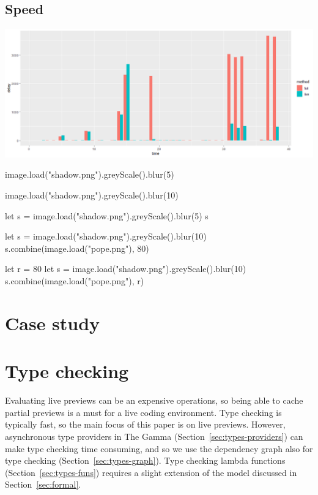 \documentclass[acmsmall,anonymous,fleqn]{acmart}\settopmatter{printfolios=false,printccs=false,printacmref=false}
\theoremstyle{plain}
\theoremstyle{definition}
\begin{document}


\subsection{Speed}
\label{sec:evaluation-empirical}

\includegraphics[scale=0.4]{drawing.png}

image.load("shadow.png").greyScale().blur(5)

image.load("shadow.png").greyScale().blur(10)

let s = image.load("shadow.png").greyScale().blur(5)
s

let s = image.load("shadow.png").greyScale().blur(10)
s.combine(image.load("pope.png"), 80)

let r = 80
let s = image.load("shadow.png").greyScale().blur(10)
s.combine(image.load("pope.png"), r)

\newpage

\section{Case study}
\label{sec:case}


\section{Type checking}
\label{sec:types}

Evaluating live previews can be an expensive operations, so being able to cache partial previews
is a must for a live coding environment. Type checking is typically fast, so the main focus of
this paper is on live previews. However, asynchronous type providers in The Gamma (Section~\ref{sec:types-providers})
can make type checking time consuming, and so we use the dependency graph also for type checking
(Section~\ref{sec:types-graph}). Type checking lambda functions (Section~\ref{sec:types-funs})
requires a slight extension of the model discussed in Section~\ref{sec:formal}.
\end{document}
